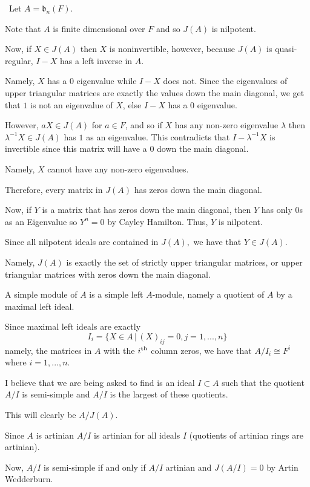 \documentclass[12pt]{AlgebraQual}
\begin{document}
\begin{solution}$\,$
Let $A=\mathfrak{b}_n(F)$.

 Note that $A$ is finite dimensional over $F$ and so $J(A)$ is nilpotent.

Now, if $X\in J(A)$ then $X$ is noninvertible, however, because $J(A)$ is quasi-regular, $I-X$ has a left inverse in $A$.

Namely, $X$ has a $0$ eigenvalue while $I-X$ does not. Since the eigenvalues of upper triangular matrices are exactly the values down the main diagonal, we get that $1$ is not an eigenvalue of $X$, else $I-X$ has a $0$ eigenvalue.

However, $aX\in J(A)$ for $a\in F$, and so if $X$ has any non-zero eigenvalue $\lambda$ then $\lambda^{-1}X\in J(A)$ has $1$ as an eigenvalue. This contradicts that $I-\lambda^{-1}X$ is invertible since this matrix will have a $0$ down the main diagonal.

Namely, $X$ cannot have any non-zero eigenvalues.

Therefore, every matrix in $J(A)$ has zeros down the main diagonal.

Now, if $Y$ is a matrix that has zeros down the main diagonal, then $Y$ has only $0$s as an Eigenvalue so $Y^n=0$ by Cayley Hamilton. Thus, $Y$ is nilpotent.

Since all nilpotent ideals are contained in $J(A),$ we have that $Y\in J(A)$.

Namely, $J(A)$ is exactly the set of strictly upper triangular matrices, or upper triangular matrices with zeros down the main diagonal.

 A simple module of $A$ is a simple left $A$-module, namely a quotient of $A$ by a maximal left ideal.

Since maximal left ideals are exactly $$I_i=\{X\in A\,|\, (X)_{ij}=0, j=1,...,n\}$$ namely, the matrices in $A$ with the $i^\text{th}$ column zeros, we have that $A/I_i\cong F^i$ where $i=1,...,n$.

 I believe that we are being asked to find is an ideal $I\subset A$ such that the quotient $A/I$ is semi-simple and $A/I$ is the largest of these quotients.

This will clearly be $A/J(A).$

Since $A$ is artinian $A/I$ is artinian for all ideals $I$ (quotients of artinian rings are artinian).

Now, $A/I$ is semi-simple if and only if $A/I$ artinian and $J(A/I)=0$ by Artin Wedderburn.


\end{solution}
\end{document}
